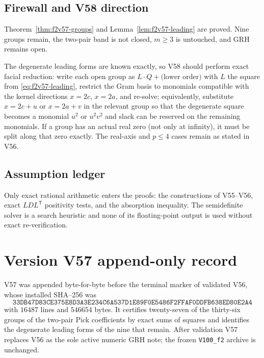 \documentclass[11pt]{article}
\theoremstyle{definition}
\theoremstyle{remark}
\begin{document}
\subsection*{Firewall and V58 direction}
\label{fire:f2v57}
Theorem~\ref{thm:f2v57-groups} and Lemma~\ref{lem:f2v57-leading} are
proved.  Nine groups remain, the two-pair band is not closed, \(m\ge3\)
is untouched, and GRH remains open.

The degenerate leading forms are known exactly, so V58 should perform
exact facial reduction: write each open group as
\(L\cdot Q+\text{(lower order)}\) with \(L\) the square from
\eqref{eq:f2v57-leading}, restrict the Gram basis to monomials
compatible with the kernel directions \(x=2c\), \(x=2a\), and re-solve;
equivalently, substitute \(x=2c+u\) or \(x=2a+v\) in the relevant
group so that the degenerate square becomes a monomial \(u^2\) or
\(u^2v^2\) and slack can be reserved on the remaining monomials.  If a
group has an actual real zero (not only at infinity), it must be split
along that zero exactly.  The real-axis and \(p\le4\) cases remain
as stated in V56.

\subsection*{Assumption ledger}
\label{ass:f2v57}
Only exact rational arithmetic enters the proofs: the constructions of
V55--V56, exact \(LDL^{\mathsf T}\) positivity tests, and the absorption
inequality.  The semidefinite solver is a search heuristic and none of
its floating-point output is used without exact re-verification.
\endgroup

\section*{Version V57 append-only record}

V57 was appended byte-for-byte before the terminal marker of validated
V56, whose installed SHA--256 was
\[
 \texttt{33DB47D83CE375E8D3A3E234C6A537D1}
 \allowbreak\texttt{E89F0E5486F2FFAF0DDFB638ED80E2A4}
\]
with \(16487\) lines and \(546654\) bytes.  It certifies twenty-seven
of the thirty-six groups of the two-pair Pick coefficients by exact
sums of squares and identifies the degenerate leading forms of the
nine that remain.  After validation V57 replaces V56 as the sole active
numeric GRH note; the frozen \texttt{V100\_f2} archive is unchanged.

\end{document}
